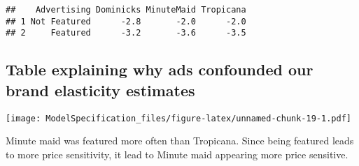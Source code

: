 \documentclass[
]{article}
\newenvironment{Shaded}{\begin{snugshade}}{\end{snugshade}}
\newcommand{\AttributeTok}[1]{\textcolor[rgb]{0.13,0.29,0.53}{#1}}
\newcommand{\FunctionTok}[1]{\textcolor[rgb]{0.13,0.29,0.53}{\textbf{#1}}}
\newcommand{\NormalTok}[1]{#1}
\newcommand{\OtherTok}[1]{\textcolor[rgb]{0.56,0.35,0.01}{#1}}
\newcommand{\SpecialCharTok}[1]{\textcolor[rgb]{0.81,0.36,0.00}{\textbf{#1}}}
\newcommand{\StringTok}[1]{\textcolor[rgb]{0.31,0.60,0.02}{#1}}
\begin{document}
\begin{verbatim}
##    Advertising Dominicks MinuteMaid Tropicana
## 1 Not Featured      -2.8       -2.0      -2.0
## 2     Featured      -3.2       -3.6      -3.5
\end{verbatim}

\subsection{Table explaining why ads confounded our brand elasticity
estimates}\label{table-explaining-why-ads-confounded-our-brand-elasticity-estimates}

\begin{Shaded}
\end{Shaded}

\texttt{[image: ModelSpecification\_files/figure-latex/unnamed-chunk-19-1.pdf]}

Minute maid was featured more often than Tropicana. Since being featured
leads to more price sensitivity, it lead to Minute maid appearing more
price sensitive.
\end{document}
